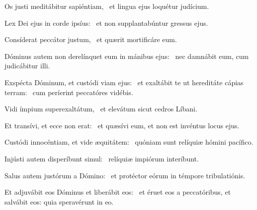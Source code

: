 
\item Os justi meditábitur sapiéntiam,~\psstar{} et lingua ejus loquétur judícium.

\item Lex Dei ejus in corde ipsíus:~\psstar{} et non supplantabúntur gressus ejus.

\item Consíderat peccátor justum,~\psstar{} et quærit mortificáre eum.

\item Dóminus autem non derelínquet eum in mánibus ejus:~\psstar{} nec damnábit eum, cum judicábitur illi.

\item Exspécta Dóminum, et custódi viam ejus:~\pscross{} et exaltábit te ut hereditáte cápias terram:~\psstar{} cum períerint peccatóres vidébis.

\item Vidi ímpium superexaltátum,~\psstar{} et elevátum sicut cedros Líbani.

\item Et transívi, et ecce non erat:~\psstar{} et quæsívi eum, et non est invéntus locus ejus.

\item Custódi innocéntiam, et vide æquitátem:~\psstar{} quóniam sunt relíquiæ hómini pacífico.

\item Injústi autem disperíbunt simul:~\psstar{} relíquiæ impiórum interíbunt.

\item Salus autem justórum a Dómino:~\psstar{} et protéctor eórum in témpore tribulatiónis.

\item Et adjuvábit eos Dóminus et liberábit eos:~\psstar{} et éruet eos a peccatóribus, et salvábit eos: quia speravérunt in eo.